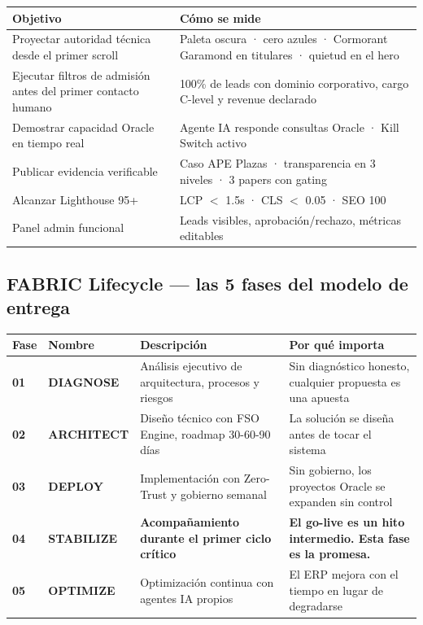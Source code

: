 \documentclass[11pt, a4paper]{article}
\begin{document}
\begin{table}[h]
\centering
\begin{tabularx}{\linewidth}{X >{\small}X}
\toprule
Objetivo & Cómo se mide \\
\midrule
Proyectar autoridad técnica desde el primer scroll &
  Paleta oscura · cero azules · Cormorant Garamond en titulares · quietud en el hero \\
Ejecutar filtros de admisión antes del primer contacto humano &
  100\% de leads con dominio corporativo, cargo C-level y revenue declarado \\
Demostrar capacidad Oracle en tiempo real &
  Agente IA responde consultas Oracle · Kill Switch activo \\
Publicar evidencia verificable &
  Caso APE Plazas · transparencia en 3 niveles · 3 papers con gating \\
Alcanzar Lighthouse 95+ &
  LCP $<$ 1.5s · CLS $<$ 0.05 · SEO 100 \\
Panel admin funcional &
  Leads visibles, aprobación/rechazo, métricas editables \\
\bottomrule
\end{tabularx}
\end{table}

\subsection{FABRIC Lifecycle — las 5 fases del modelo de entrega}

\begin{table}[h]
\centering
\begin{tabularx}{\linewidth}{>{\ttfamily\color{accent}\bfseries}l >{\bfseries}l X X}
\toprule
Fase & Nombre & Descripción & Por qué importa \\
\midrule
01 & DIAGNOSE   & Análisis ejecutivo de arquitectura, procesos y riesgos &
                  Sin diagnóstico honesto, cualquier propuesta es una apuesta \\
02 & ARCHITECT  & Diseño técnico con FSO Engine, roadmap 30-60-90 días &
                  La solución se diseña antes de tocar el sistema \\
03 & DEPLOY     & Implementación con Zero-Trust y gobierno semanal &
                  Sin gobierno, los proyectos Oracle se expanden sin control \\
04 & STABILIZE  & \textbf{Acompañamiento durante el primer ciclo crítico} &
                  \textbf{El go-live es un hito intermedio. Esta fase es la promesa.} \\
05 & OPTIMIZE   & Optimización continua con agentes IA propios &
                  El ERP mejora con el tiempo en lugar de degradarse \\
\bottomrule
\end{tabularx}
\end{table}
\end{document}
